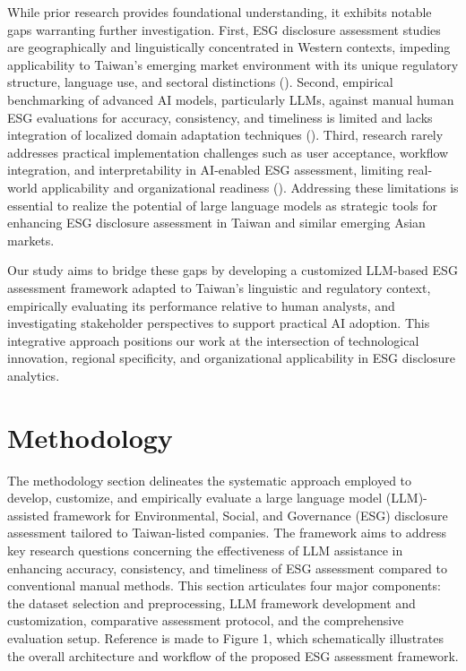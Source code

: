 \documentclass[
  12pt,
]{article}
\begin{document}
While prior research provides foundational understanding, it exhibits
notable gaps warranting further investigation. First, ESG disclosure
assessment studies are geographically and linguistically concentrated in
Western contexts, impeding applicability to Taiwan's emerging market
environment with its unique regulatory structure, language use, and
sectoral distinctions ().
Second, empirical benchmarking of advanced AI models, particularly LLMs,
against manual human ESG evaluations for accuracy, consistency, and
timeliness is limited and lacks integration of localized domain
adaptation techniques (). Third, research rarely addresses practical implementation
challenges such as user acceptance, workflow integration, and
interpretability in AI-enabled ESG assessment, limiting real-world
applicability and organizational readiness
(). Addressing these limitations
is essential to realize the potential of large language models as
strategic tools for enhancing ESG disclosure assessment in Taiwan and
similar emerging Asian markets.

Our study aims to bridge these gaps by developing a customized LLM-based
ESG assessment framework adapted to Taiwan's linguistic and regulatory
context, empirically evaluating its performance relative to human
analysts, and investigating stakeholder perspectives to support
practical AI adoption. This integrative approach positions our work at
the intersection of technological innovation, regional specificity, and
organizational applicability in ESG disclosure analytics.

\section{Methodology}\label{methodology}

The methodology section delineates the systematic approach employed to
develop, customize, and empirically evaluate a large language model
(LLM)-assisted framework for Environmental, Social, and Governance (ESG)
disclosure assessment tailored to Taiwan-listed companies. The framework
aims to address key research questions concerning the effectiveness of
LLM assistance in enhancing accuracy, consistency, and timeliness of ESG
assessment compared to conventional manual methods. This section
articulates four major components: the dataset selection and
preprocessing, LLM framework development and customization, comparative
assessment protocol, and the comprehensive evaluation setup. Reference
is made to Figure 1, which schematically illustrates the overall
architecture and workflow of the proposed ESG assessment framework.
\end{document}
